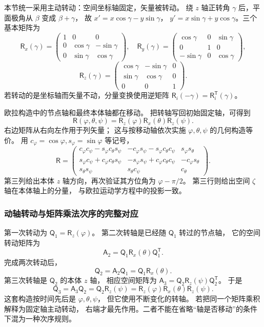 \documentclass[UTF8,zihao=-4,fontset=fandol,a4paper]{ctexart}
\begin{document}
本节统一采用主动转动：空间坐标轴固定，矢量被转动。
绕 $z$ 轴正转角 $\gamma$ 后，平面极角从 $\beta$ 变成 $\beta+\gamma$，
故 $x'=x\cos\gamma-y\sin\gamma$，
$y'=x\sin\gamma+y\cos\gamma$。三个基本矩阵为
\[
\mathsf R_x(\gamma)=
\begin{pmatrix}1&0&0\\0&\cos\gamma&-\sin\gamma\\0&\sin\gamma&\cos\gamma\end{pmatrix},
\quad
\mathsf R_y(\gamma)=
\begin{pmatrix}\cos\gamma&0&\sin\gamma\\0&1&0\\-\sin\gamma&0&\cos\gamma\end{pmatrix},
\]
\[
\mathsf R_z(\gamma)=
\begin{pmatrix}\cos\gamma&-\sin\gamma&0\\\sin\gamma&\cos\gamma&0\\0&0&1\end{pmatrix}.
\]
若转动的是坐标轴而矢量不动，分量变换使用逆矩阵
$\mathsf R_i(-\gamma)=\mathsf R_i^{\mathsf T}(\gamma)$。

欧拉构造中的节点轴和最终本体轴都在移动。
把转轴写回初始固定轴，可得到
\begin{equation}
\mathsf R(\varphi,\theta,\psi)
=\mathsf R_z(\varphi)\mathsf R_x(\theta)\mathsf R_z(\psi).
\end{equation}
右边矩阵从右向左作用于列矢量；
这与按移动轴依次实施 $\varphi,\theta,\psi$ 的几何构造等价。
用 $c_\varphi=\cos\varphi,s_\varphi=\sin\varphi$ 等记号，
\[
\mathsf R=
\begin{pmatrix}
c_\varphi c_\psi-s_\varphi c_\theta s_\psi&
-c_\varphi s_\psi-s_\varphi c_\theta c_\psi&s_\varphi s_\theta\\
s_\varphi c_\psi+c_\varphi c_\theta s_\psi&
-s_\varphi s_\psi+c_\varphi c_\theta c_\psi&-c_\varphi s_\theta\\
s_\theta s_\psi&s_\theta c_\psi&c_\theta
\end{pmatrix}.
\]
第三列给出本体 $z$ 轴方向，再次验证其方位角为 $\varphi-\pi/2$。
第三行则给出空间 $\zeta$ 轴在本体轴上的分量，
与欧拉运动学方程中的投影一致。


\subsubsection*{动轴转动与矩阵乘法次序的完整对应}
第一次转动为 $\mathsf Q_1=\mathsf R_z(\varphi)$。
第二次转轴是已经随 $\mathsf Q_1$ 转过的节点轴，
它的空间转动矩阵为
\[
\mathsf A_2=\mathsf Q_1\mathsf R_x(\theta)\mathsf Q_1^{\mathsf T}.
\]
完成两次转动后，
\[
\mathsf Q_2=\mathsf A_2\mathsf Q_1
=\mathsf Q_1\mathsf R_x(\theta).
\]
第三次转轴是 $\mathsf Q_2$ 的本体 $z$ 轴，
相应空间矩阵为
$\mathsf A_3=\mathsf Q_2\mathsf R_z(\psi)\mathsf Q_2^{\mathsf T}$。
于是
\[
\mathsf Q_3=\mathsf A_3\mathsf Q_2
=\mathsf Q_2\mathsf R_z(\psi)
=\mathsf R_z(\varphi)\mathsf R_x(\theta)\mathsf R_z(\psi).
\]
这套构造按时间先后是 $\varphi,\theta,\psi$，
但它使用不断变化的转轴。
若把同一个矩阵乘积解释为固定轴主动转动，
右端才最先作用。二者不能在省略“轴是否移动”的条件下混为一种次序规则。
\end{document}
